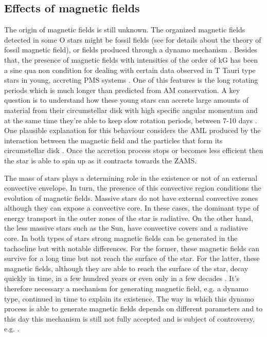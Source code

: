 \documentclass[fleqn,usenatbib]{mnras}
\begin{document}
\subsection{Effects of magnetic fields}
The origin of magnetic fields is still unknown. The organized magnetic fields detected in some O stars \citep{Wade2010} might be fossil fields (see \citet{Dudorov2014} for details about the theory of fossil magnetic field), or fields produced through a dynamo mechanism \citep{Cantiello2009}. Besides that, the presence of magnetic fields with intensities of the order of kG \citep{Hussain2014} has been a sine qua non condition for dealing with certain data observed in T Tauri type stars in young, accreting PMS systems \citep{Johns-Krull2007}. One of this features is the long rotating periods  which is much longer than predicted from AM conservation. A key question is to understand how these young stars can accrete large amounts of material from their circumstellar disk with high specific angular momentum and at the same time they're able to keep slow rotation periods, between 7-10 days \citep{Hussain2014}. One plausible explanation for this behaviour considers the AML produced by the interaction between the magnetic field and the particles that form its circumstellar disk \citep{Zanni2012}. Once the accretion process stops or becomes less efficient then the star is able to spin up as it contracts towards the ZAMS.\par

The mass of stars plays a determining role in the existence or not of an external convective envelope. In turn, the presence of this convective region conditions the evolution of magnetic fields. Massive stars do not have external convective zones although they can expose a convective core. In these cases, the dominant type of energy transport in the outer zones of the star is radiative. On the other hand, the less massive stars such as the Sun, have convective covers and a radiative core. In both types of stars strong magnetic fields can be generated in the tachocline but with notable differences. For the former, these magnetic fields can survive for a long time but not reach the surface of the star. For the latter, these magnetic fields, although they are able to reach the surface of the star, decay quickly in time, in a few hundred years or even only in a few decades \citep{Chabrier2006}. It's therefore necessary a mechanism for generating magnetic field, e.g. a dynamo type, continued in time to explain its existence. The way in which this dynamo process is able to generate magnetic fields depends on different parameters and to this day this mechanism is still not fully accepted and is subject of controversy, e.g. \citet{Charbonneau2010}.\par
\end{document}
